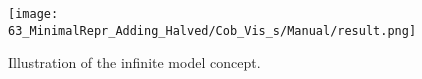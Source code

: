 \begin{figure}
	\centering
	\texttt{[image: 63\_MinimalRepr\_Adding\_Halved/Cob\_Vis\_s/Manual/result.png]}
	\caption{Illustration of the infinite model concept.}
	\label{fig:minrep.infinite.model.concept}
\end{figure}




